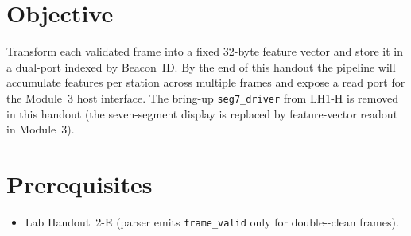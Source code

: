 \documentclass[11pt,letterpaper]{article}
\begin{document}

\section{Objective}
Transform each validated frame into a fixed 32-byte feature vector and store it in a dual-port \BRAM{} indexed by Beacon~ID. By the end of this handout the pipeline will accumulate features per station across multiple frames and expose a read port for the Module~3 host interface. The bring-up \texttt{seg7\_driver} from LH1-H is removed in this handout (the seven-segment display is replaced by feature-vector readout in Module~3).

\section{Prerequisites}
\begin{itemize}[leftmargin=2em]
	\item Lab Handout~2-E (parser emits \texttt{frame\_valid} only for double-\CRC{}-clean frames).
\end{itemize}
\end{document}
